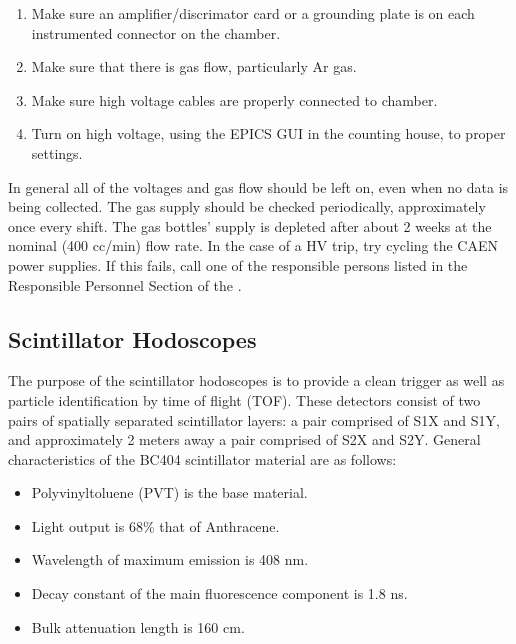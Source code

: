 {\begin{enumerate}
\item {Make sure an amplifier/discrimator card or a grounding plate is on each instrumented
connector on the chamber.}
\item {Make sure that there is gas flow, particularly Ar gas.}
\item {Make sure high voltage cables are properly connected to
chamber.}
\item {Turn on high voltage, using the EPICS GUI in the counting house,
to proper settings.}
\end{enumerate}


In general all of the voltages and gas flow should be left on, even when
no data is being collected.  The gas supply should be checked periodically,
approximately once every shift.  The gas bottles' supply is depleted
after about 2 weeks at the nominal (400 cc/min) flow rate.
In the case of a HV trip, try cycling the CAEN power supplies.  If this fails, call
one of the responsible persons listed in the Responsible Personnel Section
of the .




\subsection{Scintillator Hodoscopes}

The purpose of the scintillator hodoscopes is to provide a clean
trigger as well as particle identification by time of flight (TOF). These
detectors consist of two pairs of spatially separated scintillator
layers: a pair comprised of S1X and S1Y, and approximately 2 meters away a pair
comprised of S2X and S2Y. General characteristics of the BC404 scintillator
material are as follows:

\begin{itemize}
\item{Polyvinyltoluene (PVT) is the base material. }
\item{Light output is 68\% that of Anthracene. }
\item{Wavelength of maximum emission is 408 nm.}
\item{Decay constant of the main fluorescence component is 1.8 ns.}
\item{Bulk attenuation length is 160 cm.}
\end{itemize}

}
